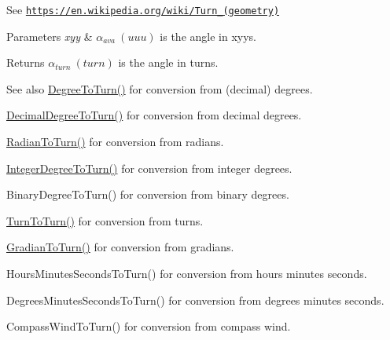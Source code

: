 See \href{https://en.wikipedia.org/wiki/Turn_(geometry)}{\tt https\+://en.\+wikipedia.\+org/wiki/\+Turn\+\_\+(geometry)} 
\begin{DoxyParams}{Parameters}
{\em xyy} & $\alpha_{ava}\ (uuu)$ is the angle in xyys. \\
\hline
\end{DoxyParams}
\begin{DoxyReturn}{Returns}
$\alpha_{turn}\ (turn)$ is the angle in turns. 
\end{DoxyReturn}
\begin{DoxySeeAlso}{See also}
\mbox{\hyperlink{group___e_g_x_math-_angle_conversions-_degree_gafb4ce930493a7d6202ede3ee1630ef5d}{Degree\+To\+Turn()}} for conversion from (decimal) degrees. 

\mbox{\hyperlink{group___e_g_x_math-_angle_conversions-_decimal_degree_ga396a13c10acdef5026c12f3217b142c1}{Decimal\+Degree\+To\+Turn()}} for conversion from decimal degrees. 

\mbox{\hyperlink{group___e_g_x_math-_angle_conversions-_radian_ga8492d6d2f6467c619b65e5fb75a9ae04}{Radian\+To\+Turn()}} for conversion from radians. 

\mbox{\hyperlink{group___e_g_x_math-_angle_conversions-_integer_degree_ga06ddbdada5a3978105c855d4aae735ae}{Integer\+Degree\+To\+Turn()}} for conversion from integer degrees. 

Binary\+Degree\+To\+Turn() for conversion from binary degrees. 

\mbox{\hyperlink{group___e_g_x_math-_angle_conversions-_turn_ga32c8dfa2861fefd0b18e36f8d6d95ed4}{Turn\+To\+Turn()}} for conversion from turns. 

\mbox{\hyperlink{group___e_g_x_math-_angle_conversions-_gradian_ga11b42138910d26474f47c0a2043911c9}{Gradian\+To\+Turn()}} for conversion from gradians. 

Hours\+Minutes\+Seconds\+To\+Turn() for conversion from hours minutes seconds. 

Degrees\+Minutes\+Seconds\+To\+Turn() for conversion from degrees minutes seconds. 

Compass\+Wind\+To\+Turn() for conversion from compass wind. 
\end{DoxySeeAlso}
